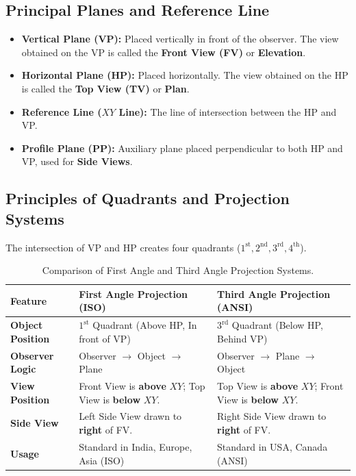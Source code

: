 \subsection{Principal Planes and Reference Line}
\begin{itemize}
    \item \textbf{Vertical Plane (VP):} Placed vertically in front of the observer. The view obtained on the VP is called the \textbf{Front View (FV)} or \textbf{Elevation}.
    \item \textbf{Horizontal Plane (HP):} Placed horizontally. The view obtained on the HP is called the \textbf{Top View (TV)} or \textbf{Plan}.
    \item \textbf{Reference Line ($XY$ Line):} The line of intersection between the HP and VP.
    \item \textbf{Profile Plane (PP):} Auxiliary plane placed perpendicular to both HP and VP, used for \textbf{Side Views}.
\end{itemize}

\subsection{Principles of Quadrants and Projection Systems}

The intersection of VP and HP creates four quadrants ($1^{\text{st}}, 2^{\text{nd}}, 3^{\text{rd}}, 4^{\text{th}}$).

\begin{table}[htbp]
\centering
\small
\begin{tabularx}{\textwidth}{l X X}
\toprule
\textbf{Feature} & \textbf{First Angle Projection (ISO)} & \textbf{Third Angle Projection (ANSI)} \\
\midrule
\textbf{Object Position} & $1^{\text{st}}$ Quadrant (Above HP, In front of VP) & $3^{\text{rd}}$ Quadrant (Below HP, Behind VP) \\
\textbf{Observer Logic} & Observer $\longrightarrow$ Object $\longrightarrow$ Plane & Observer $\longrightarrow$ Plane $\longrightarrow$ Object \\
\textbf{View Position} & Front View is \textbf{above} $XY$; Top View is \textbf{below} $XY$. & Top View is \textbf{above} $XY$; Front View is \textbf{below} $XY$. \\
\textbf{Side View} & Left Side View drawn to \textbf{right} of FV. & Right Side View drawn to \textbf{right} of FV. \\
\textbf{Usage} & Standard in India, Europe, Asia (ISO) & Standard in USA, Canada (ANSI) \\
\bottomrule
\end{tabularx}
\caption{Comparison of First Angle and Third Angle Projection Systems.}
\label{tab:1st-3rd-angle}
\end{table}

